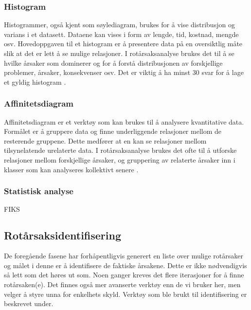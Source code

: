 \subsubsection{Histogram}
Histogrammer, også kjent som søylediagram, brukes for å vise distribusjon og varians i et datasett. Dataene kan vises i form av lengde, tid, kostnad, mengde osv. Hovedoppgaven til et histogram er å presentere data på en oversiktlig måte slik at det er lett å se mulige relasjoner. I rotårsaksanalyse brukes det til å se hvilke årsaker som dominerer og for å forstå distribusjonen av forskjellige problemer, årsaker, konsekvenser osv. \cite{RCA} Det er viktig å ha minst 30 svar for å lage et gyldig histogram \cite{RCA}.

\subsubsection{Affinitetsdiagram}
Affinitetsdiagram er et verktøy som kan brukes til å analysere kvantitative data. Formålet er å gruppere data og finne underliggende relasjoner mellom de resterende gruppene. Dette medfører at en kan se relasjoner mellom tilsynelatende urelaterte data. I rotårsaksanalyse brukes det ofte til å utforske relasjoner mellom forskjellige årsaker, og gruppering av relaterte årsaker inn i klasser som kan analyseres kollektivt senere \cite{RCA}. 

\subsubsection{Statistisk analyse}
FIKS

\subsection{Rotårsaksidentifisering}
De foregående fasene har forhåpentligvis generert en liste over mulige rotårsaker og målet i denne er å identifisere de faktiske årsakene. Dette er ikke nødvendigvis så lett som det høres ut som. Noen ganger kreves det flere iterasjoner for å finne rotårsaken(e). Det finnes også mer avanserte verktøy enn de vi bruker her, men velger å styre unna for enkelhets skyld. Verktøy som ble brukt til identifisering er beskrevet under. 

